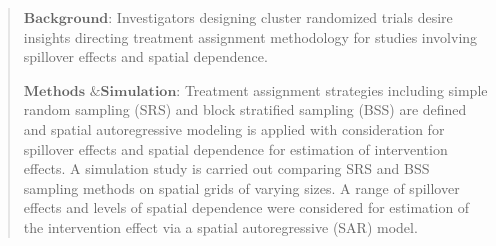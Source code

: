 \documentclass{article}[11pt]
\begin{document}
\begin{abstract}
   $\textbf{Background}$: Investigators designing cluster randomized trials desire insights directing treatment assignment methodology for studies involving spillover effects and spatial dependence.



   $\textbf{Methods \& Simulation}$: Treatment assignment strategies including simple random sampling (SRS) and block stratified sampling (BSS) are defined and spatial autoregressive modeling is applied with consideration for spillover effects and spatial dependence for estimation of intervention effects. A simulation study is carried out comparing SRS and BSS sampling methods on spatial grids of varying sizes. A range of spillover effects and levels of spatial dependence were considered for estimation of the intervention effect via a spatial autoregressive (SAR) model.



\end{abstract}
\end{document}
